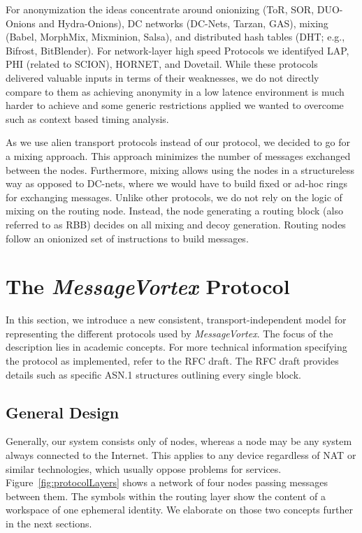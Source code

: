 \documentclass[acmsmall, screen, review]{acmart}
\begin{document}
	For anonymization the ideas concentrate around onionizing (ToR\cite{tor-spec}, SOR\cite{Egners_2012}, DUO-Onions and Hydra-Onions\cite{iwanik2005duo}), DC networks (DC-Nets\cite{chaum-dc}, Tarzan\cite{tarzan:ccs02}, GAS\cite{AthanRAM07}), mixing (Babel\cite{babel}, MorphMix\cite{morphmix:wpes2002}, Mixminion\cite{minion-design}, Salsa\cite{Salsa}), and distributed hash tables (DHT; e.g., Bifrost\cite{Kondo2009}, BitBlender\cite{Bauer:2008}). For network-layer high speed Protocols we identifyed LAP\cite{hsiao2012lap}, PHI (related to SCION\cite{perrig2017scion}), HORNET\cite{chen2015hornet}, and Dovetail\cite{chen2015hornet}. While these protocols delivered valuable inputs in terms of their weaknesses, we do not directly compare to them as achieving anonymity in a low latence environment is much harder to achieve and some generic restrictions applied we wanted to overcome such as context based timing analysis.
	
	As we use alien transport protocols instead of our protocol, we decided to go for a mixing approach. This approach minimizes the number of messages exchanged between the nodes. Furthermore, mixing allows using the nodes in a structureless way as opposed to DC-nets, where we would have to build fixed or ad-hoc rings for exchanging messages. Unlike other protocols, we do not rely on the logic of mixing on the routing node. Instead, the node generating a routing block (also referred to as RBB) decides on all mixing and decoy generation. Routing nodes follow an onionized set of instructions to build messages. 
	
	\section{The \emph{MessageVortex} Protocol\label{sec:protocol}}
	In this section, we introduce a new consistent, transport-independent model for representing the different protocols used by \emph{MessageVortex}. The focus of the description lies in academic concepts. For more technical information specifying the protocol as implemented, refer to the RFC draft\cite{MessageVortexRFC}. The RFC draft provides details such as specific ASN.1 structures outlining every single block.
	
	\subsection{General Design}
	Generally, our system consists only of nodes, whereas a node may be any system always connected to the Internet. This applies to any device regardless of NAT or similar technologies, which usually oppose problems for services. Figure~\ref{fig:protocolLayers} shows a network of four nodes passing messages between them. The symbols within the routing layer show the content of a workspace of one ephemeral identity. We elaborate on those two concepts further in the next sections. 
	
\end{document}
